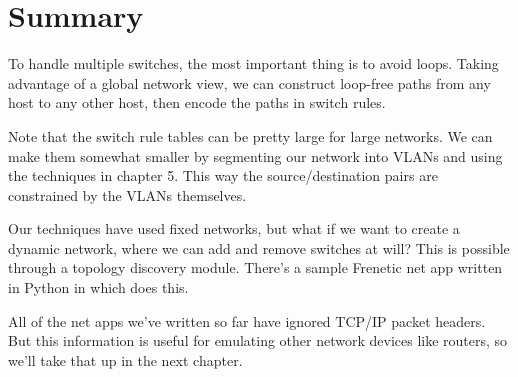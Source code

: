 \section{Summary}

To handle multiple switches, the most important thing is to avoid loops.  Taking advantage of a global network
view, we can construct loop-free paths from any host to any other host, then encode the paths in switch rules.

Note that the switch rule tables can be pretty large for large networks.  We can make them somewhat smaller 
by segmenting our network into VLANs and using the techniques in chapter 5.  This way the source/destination pairs
are constrained by the VLANs themselves.  

Our techniques have used fixed networks, but what if we want to create a dynamic network, where we can add and remove
switches at will?  This is possible through a topology discovery module.  There's a sample Frenetic net app written
in Python in  which does this.

All of the net apps we've written so far have ignored TCP/IP packet headers.  But this information is useful
for emulating other network devices like routers, so we'll take that up in the next chapter.  